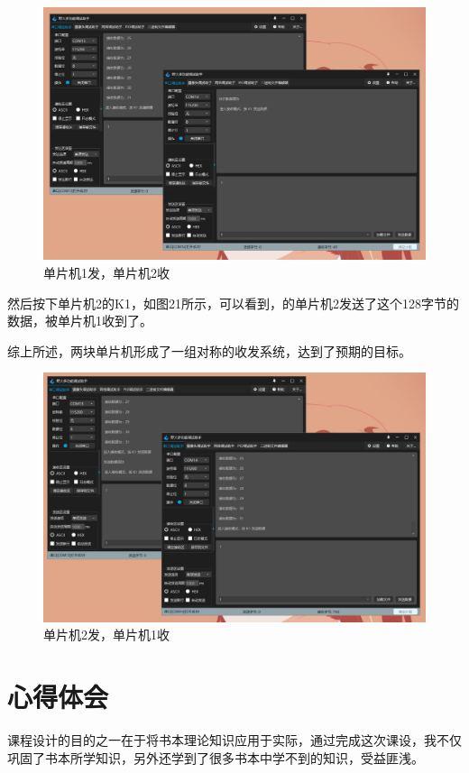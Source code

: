 \documentclass[UTF8,a4paper,11pt]{article}
\begin{document}
\begin{figure}[htbp]
    \centering
    \includegraphics[scale=0.4]{p20.png}
    \caption{单片机1发，单片机2收}
\end{figure}

然后按下单片机2的K1，如图21所示，可以看到，的单片机2发送了这个128字节的数据，被单片机1收到了。

综上所述，两块单片机形成了一组对称的收发系统，达到了预期的目标。
\begin{figure}[htbp]
    \centering
    \includegraphics[scale=0.4]{p21.png}
    \caption{单片机2发，单片机1收}
\end{figure}
\clearpage

\section{心得体会}
课程设计的目的之一在于将书本理论知识应用于实际，通过完成这次课设，我不仅巩固了书本所学知识，另外还学到了很多书本中学不到的知识，受益匪浅。
\end{document}
